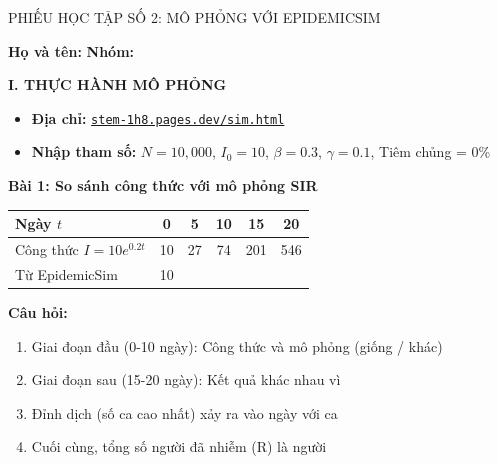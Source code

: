 \documentclass[12pt,a4paper]{article}
\newcommand{\header}[1]{\cellcolor{TableHeader}\sffamily\bfseries#1}
\begin{document}
\newpage
\begin{phieuhoctap}{PHIẾU HỌC TẬP SỐ 2: MÔ PHỎNG VỚI EPIDEMICSIM}

\noindent\textbf{Họ và tên:} \underline{\hspace{5cm}} \hfill \textbf{Nhóm:} \underline{\hspace{2cm}}

\vspace{0.5cm}
\textbf{\color{primary}\large I. THỰC HÀNH MÔ PHỎNG}

\begin{itemize}
\item \textbf{Địa chỉ:} \href{https://stem-1h8.pages.dev/sim.html}{\texttt{stem-1h8.pages.dev/sim.html}}
\item \textbf{Nhập tham số:} $N = 10{,}000$, $I_0 = 10$, $\beta = 0.3$, $\gamma = 0.1$, Tiêm chủng = 0\%
\end{itemize}

\textbf{\color{accent} Bài 1: So sánh công thức với mô phỏng SIR}

\begin{center}
\begin{tabularx}{0.9\textwidth}{|L|C|C|C|C|C|}
\hline
\header{Ngày $t$} & 0 & 5 & 10 & 15 & 20 \\
\hline
Công thức $I = 10e^{0.2t}$ & 10 & 27 & 74 & 201 & 546 \\
\hline
Từ EpidemicSim & 10 & \underline{\hspace{1cm}} & \underline{\hspace{1cm}} & \underline{\hspace{1cm}} & \underline{\hspace{1cm}} \\
\hline
\end{tabularx}
\end{center}

\textbf{Câu hỏi:}
\begin{enumerate}[label=\alph*)]
\item Giai đoạn đầu (0-10 ngày): Công thức và mô phỏng \underline{\hspace{3cm}} (giống / khác)
\item Giai đoạn sau (15-20 ngày): Kết quả khác nhau vì \underline{\hspace{5cm}}
\item Đỉnh dịch (số ca cao nhất) xảy ra vào ngày \underline{\hspace{2cm}} với \underline{\hspace{3cm}} ca
\item Cuối cùng, tổng số người đã nhiễm (R) là \underline{\hspace{3cm}} người
\end{enumerate}


\end{phieuhoctap}
\end{document}
